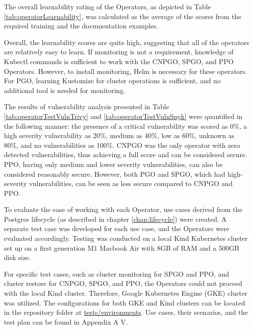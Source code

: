 The overall learnability rating of the Operators, as depicted in Table \ref{tab:operatorLearnability}, was calculated as the average of the scores from the required training and the documentation examples.

Overall, the learnability scores are quite high, suggesting that all of the operators are relatively easy to learn. If monitoring is not a requirement, knowledge of Kubectl commands is sufficient to work with the CNPGO, SPGO, and PPO Operators. However, to install monitoring, Helm is necessary for these operators. For PGO, learning Kustomize for cluster operations is sufficient, and no additional tool is needed for monitoring.


The results of vulnerability analysis presented in Table \ref{tab:operatorTestVulnTrivy} and \ref{tab:operatorTestVulnSnyk} were quantified in the following manner: the presence of a critical vulnerability was scored as 0\%, a high severity vulnerability as 20\%, medium as 40\%, low as 60\%, unknown as 80\%, and no vulnerabilities as 100\%. CNPGO was the only operator with zero detected vulnerabilities, thus achieving a full score and can be considered secure. PPO, having only medium and lower severity vulnerabilities, can also be considered reasonably secure. However, both PGO and SPGO, which had high-severity vulnerabilities, can be seen as less secure compared to CNPGO and PPO.

\label{chap:testOperatbility}
To evaluate the ease of working with each Operator, use cases derived from the Postgres lifecycle (as described in chapter \ref{chap:lifecycle}) were created. A separate test case was developed for each use case, and the Operators were evaluated accordingly.
Testing was conducted on a local Kind Kubernetes cluster set up on a first generation M1 Macbook Air with 8GB of RAM and a 500GB disk size.

For specific test cases, such as cluster monitoring for SPGO and PPO, and cluster restore for CNPGO, SPGO, and PPO, the Operators could not proceed with the local Kind cluster. Therefore, Google Kubernetes Engine (GKE) cluster was utilized. The configurations for both GKE and Kind clusters can be located in the repository folder at \url{tests/environments}.
Use cases, their scenarios, and the test plan can be found in Appendix A V.

